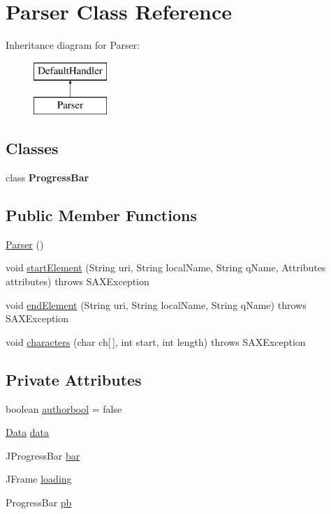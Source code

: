 \hypertarget{class_parser}{}\section{Parser Class Reference}
\label{class_parser}
Inheritance diagram for Parser\+:\begin{figure}[H]
\begin{center}
\leavevmode
\includegraphics[height=2.000000cm]{class_parser}
\end{center}
\end{figure}
\subsection*{Classes}
\begin{DoxyCompactItemize}
\item 
class {\bfseries Progress\+Bar}
\end{DoxyCompactItemize}
\subsection*{Public Member Functions}
\begin{DoxyCompactItemize}
\item 
\hyperlink{class_parser_a5b20dc7a1c7a26ce3cec6cc070839bd4}{Parser} ()
\item 
void \hyperlink{class_parser_a6ca2235d63e8d6ce30a4a7c3e2deb523}{start\+Element} (String uri, String local\+Name, String q\+Name, Attributes attributes)  throws S\+A\+X\+Exception 
\item 
void \hyperlink{class_parser_a6235e3c77c809f5012c95629345e0f2f}{end\+Element} (String uri, String local\+Name, String q\+Name)  throws S\+A\+X\+Exception 
\item 
void \hyperlink{class_parser_a47bcfb67533ee080c38771c5487edd90}{characters} (char ch\mbox{[}$\,$\mbox{]}, int start, int length)  throws S\+A\+X\+Exception 
\end{DoxyCompactItemize}
\subsection*{Private Attributes}
\begin{DoxyCompactItemize}
\item 
boolean \hyperlink{class_parser_a38dd69bd41bda280db654f766a953664}{authorbool} = false
\item 
\hyperlink{class_data}{Data} \hyperlink{class_parser_a7eaf97b8d7225ee9f312d7d1c0c96d11}{data}
\item 
J\+Progress\+Bar \hyperlink{class_parser_a87d020032494150614c01d977277eda3}{bar}
\item 
J\+Frame \hyperlink{class_parser_aa186fb30f99abea1ad8923a549d26f30}{loading}
\item 
Progress\+Bar \hyperlink{class_parser_a8e77019b8dfc3cc2a8c2bbc01ff5a657}{pb}
\end{DoxyCompactItemize}


